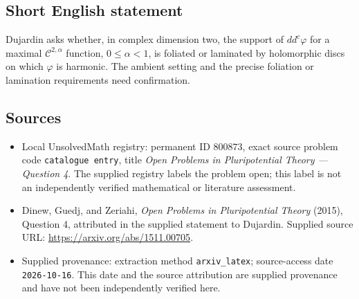 \documentclass[11pt]{article}
\begin{document}
\subsection{Short English statement}
Dujardin asks whether, in complex dimension two, the support of \(dd^c\varphi\) for a maximal \(\mathcal C^{2,\alpha}\) function, \(0\leq\alpha<1\), is foliated or laminated by holomorphic discs on which \(\varphi\) is harmonic. The ambient setting and the precise foliation or lamination requirements need confirmation.
\subsection{Sources}
\begin{itemize}
\item Local UnsolvedMath registry: permanent ID \(800873\), exact source problem code \texttt{catalogue entry}, title \emph{Open Problems in Pluripotential Theory --- Question 4}. The supplied registry labels the problem open; this label is not an independently verified mathematical or literature assessment.
\item Dinew, Guedj, and Zeriahi, \emph{Open Problems in Pluripotential Theory} (2015), Question 4, attributed in the supplied statement to Dujardin. Supplied source URL: \url{https://arxiv.org/abs/1511.00705}.
\item Supplied provenance: extraction method \texttt{arxiv\_latex}; source-access date \texttt{2026-10-16}. This date and the source attribution are supplied provenance and have not been independently verified here.
\end{itemize}
\end{document}
